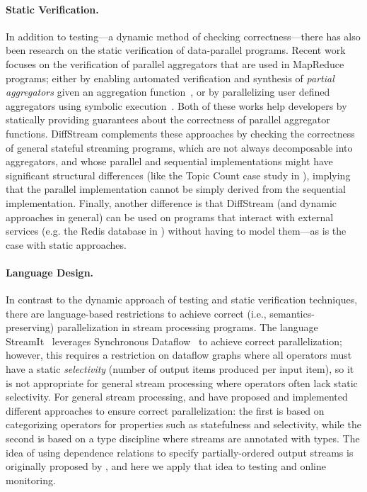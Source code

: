 \paragraph{Static Verification.}
%
In addition to testing---a dynamic method of checking
correctness---there has also been research on the static verification
of data-parallel programs. Recent work focuses on the verification of
parallel aggregators that are used in MapReduce programs; either by
enabling automated verification and synthesis of \emph{partial
aggregators} given an aggregation function~\cite{liu2014automating},
or by parallelizing user defined aggregators using symbolic
execution~\cite{raychev2015parallelizing}. Both of these works help
developers by statically providing guarantees about the correctness of
parallel aggregator functions. DiffStream complements these approaches
by checking the correctness of general stateful streaming programs,
which are not always decomposable into aggregators, and whose parallel
and sequential implementations might have significant structural
differences (like the Topic Count case study in
), implying that the parallel implementation cannot be simply
derived from the sequential implementation. Finally, another
difference is that DiffStream (and dynamic approaches in general) can be
used on programs that interact with external services (e.g. the Redis
database in ) without having to model
them---as is the case with static approaches.

\paragraph{Language Design.}
In contrast to the dynamic approach of testing and static verification techniques, there are language-based restrictions to achieve correct (i.e., semantics-preserving) parallelization in stream processing programs.
The language StreamIt~\cite{thies2002streamit} leverages Synchronous Dataflow~\cite{lee1987synchronous} to achieve correct parallelization; however, this requires a restriction on dataflow graphs where all operators must have a static \emph{selectivity} (number of output items produced per input item), so it is not appropriate for general stream processing where operators often lack static selectivity.
For general stream processing, \cite{schneider2013safe} and \cite{mamouras2019data} have proposed and implemented different approaches to ensure correct parallelization: the first is based on categorizing operators for properties such as statefulness and selectivity, while the second is based on a type discipline where streams are annotated with types. The idea of using dependence relations to specify partially-ordered output streams is originally proposed by \cite{mamouras2019data}, and here we apply that idea to testing and online monitoring.


